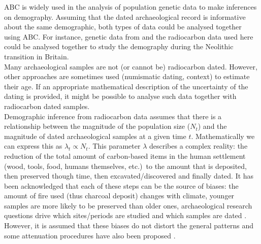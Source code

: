 \documentclass[a4paper]{article}
\begin{document}
ABC is widely used in the analysis of population genetic data to make inferences on demography. Assuming that the dated archaeological record is informative about the same demographic, both types of data could be analysed together using ABC. For instance, genetic data from \parencite[][]{Patterson2022} and the radiocarbon data used here \parencite{Bevan2017a} could be analysed together to study the demography during the Neolithic transition in Britain. 
\\


Many archaeological samples are not (or cannot be) radiocarbon dated. However, other approaches are sometimes used (numismatic dating, context) to estimate their age. If an appropriate mathematical description of the uncertainty of the dating is provided, it might be possible to analyse such data together with radiocarbon dated samples.
\\


Demographic inference from radiocarbon data assumes that there is a relationship between the magnitude of the population size ($N_t$) and the magnitude of dated archaeological samples at a given time $t$. Mathematically we can express this as $\lambda_t \propto N_t$. This parameter $\lambda$ describes a complex reality: the reduction of the total amount of carbon-based items in the human settlement (wood, tools, food, humans themselves, etc.)\ to the amount that is deposited, then preserved though time, then excavated/discovered and finally dated. It has been acknowledged that each of these steps can be the source of biases: the amount of fire used (thus charcoal deposit) changes with climate, younger samples are more likely to be preserved than older ones, archaeological research questions drive which sites/periods are studied and which samples are dated \parencite{Rick1987,Williams2012}. However, it is assumed that these biases do not distort the general patterns and some attenuation procedures have also been proposed \textcite[\emph{e.g.}\ binning][]{Shennan2013}.
\\



\end{document}
